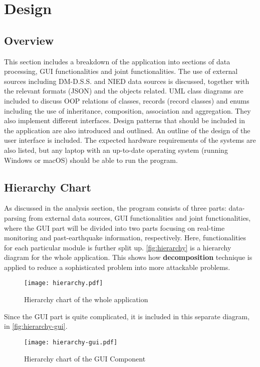 \chapter{Design}
\section*{Overview}
This section includes a breakdown of the application into sections of data processing, GUI functionalities and joint functionalities. The use of external sources including DM-D.S.S. and NIED data sources is discussed, together with the relevant formats (JSON) and the objects related. UML class diagrams are included to discuss OOP relations of classes, records (record classes) and enums including the use of inheritance, composition, association and aggregation. They also implement different interfaces. Design patterns that should be included in the application are also introduced and outlined. An outline of the design of the user interface is included. The expected hardware requirements of the systems are also listed, but any laptop with an up-to-date operating system (running Windows or macOS) should be able to run the program.

\section{Hierarchy Chart}
As discussed in the analysis section, the program consists of three parts: data-parsing from external data sources, GUI functionalities and joint functionalities, where the GUI part will be divided into two parts focusing on real-time monitoring and past-earthquake information, respectively. Here, functionalities for each particular module is further split up. \autoref{fig:hierarchy} is a hierarchy diagram for the whole application. This shows how \textbf{decomposition} technique is applied to reduce a sophisticated problem into more attackable problems.

\begin{figure}[htp]
    \centering
    \texttt{[image: hierarchy.pdf]}
    \caption{Hierarchy chart of the whole application}
    \label{fig:hierarchy}
\end{figure}

Since the GUI part is quite complicated, it is included in this separate diagram, in \autoref{fig:hierarchy-gui}.

\begin{figure}[htp]
    \centering
    \texttt{[image: hierarchy-gui.pdf]}
    \caption{Hierarchy chart of the GUI Component}
    \label{fig:hierarchy-gui}
\end{figure}

